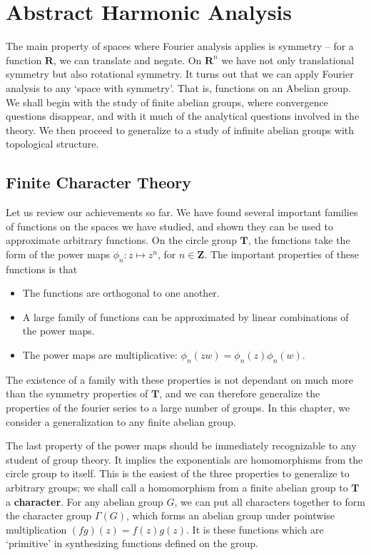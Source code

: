 
\part{Abstract Harmonic Analysis}

The main property of spaces where Fourier analysis applies is symmetry -- for a function $\mathbf{R}$, we can translate and negate. On $\mathbf{R}^n$ we have not only translational symmetry but also rotational symmetry. It turns out that we can apply Fourier analysis to any `space with symmetry'. That is, functions on an Abelian group. We shall begin with the study of finite abelian groups, where convergence questions disappear, and with it much of the analytical questions involved in the theory. We then proceed to generalize to a study of infinite abelian groups with topological structure.


\chapter{Finite Character Theory}

Let us review our achievements so far. We have found several important families of functions on the spaces we have studied, and shown they can be used to approximate arbitrary functions. On the circle group $\mathbf{T}$, the functions take the form of the power maps $\phi_n: z \mapsto z^n$, for $n \in \mathbf{Z}$. The important properties of these functions is that
%
\begin{itemize}
    \item The functions are orthogonal to one another.
    \item A large family of functions can be approximated by linear combinations of the power maps.
    \item The power maps are multiplicative: $\phi_n(zw) = \phi_n(z) \phi_n(w)$.
\end{itemize}
%
The existence of a family with these properties is not dependant on much more than the symmetry properties of $\mathbf{T}$, and we can therefore generalize the properties of the fourier series to a large number of groups. In this chapter, we consider a generalization to any finite abelian group.

The last property of the power maps should be immediately recognizable to any student of group theory. It implies the exponentials are homomorphisms from the circle group to itself. This is the easiest of the three properties to generalize to arbitrary groups; we shall call a homomorphism from a finite abelian group to $\mathbf{T}$ a {\bf character}. For any abelian group $G$, we can put all characters together to form the character group $\Gamma(G)$, which forms an abelian group under pointwise multiplication $(fg)(z) = f(z)g(z)$. It is these functions which are `primitive' in synthesizing functions defined on the group.

